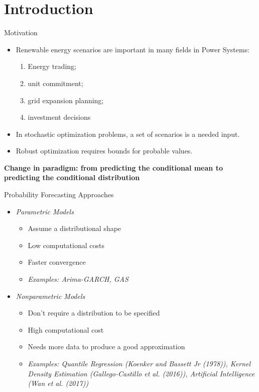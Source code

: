 

\section{Introduction}\label{introduction}

\begin{frame}{Motivation}

\begin{itemize}
\item
  Renewable energy scenarios are important in many fields in Power
  Systems:

  \begin{enumerate}
  \def\labelenumi{\roman{enumi})}
  \tightlist
  \item
    Energy trading;
  \item
    unit commitment;
  \item
    grid expansion planning;
  \item
    investment decisions
  \end{enumerate}
\item
  In stochastic optimization problems, a set of scenarios is a needed
  input.
\item
  Robust optimization requires bounds for probable values.
\end{itemize}

\textbf{Change in paradigm: from predicting the conditional mean to
predicting the conditional distribution}

\end{frame}

\begin{frame}{Probability Forecasting Approaches}

\begin{itemize}
\tightlist
\item
  \emph{Parametric Models}

  \begin{itemize}
  \tightlist
  \item
    Assume a distributional shape
  \item
    Low computational costs
  \item
    Faster convergence
  \item
    \emph{Examples: Arima-GARCH, GAS}
  \end{itemize}
\item
  \emph{Nonparametric Models}

  \begin{itemize}
  \tightlist
  \item
    Don't require a distribution to be specified
  \item
    High computational cost
  \item
    Needs more data to produce a good approximation
  \item
    \emph{Examples: Quantile Regression (Koenker and Bassett Jr (1978)),
    Kernel Density Estimation (Gallego-Castillo et al. (2016)),
    Artificial Intelligence (Wan et al. (2017))}
  \end{itemize}
\end{itemize}

\end{frame}


